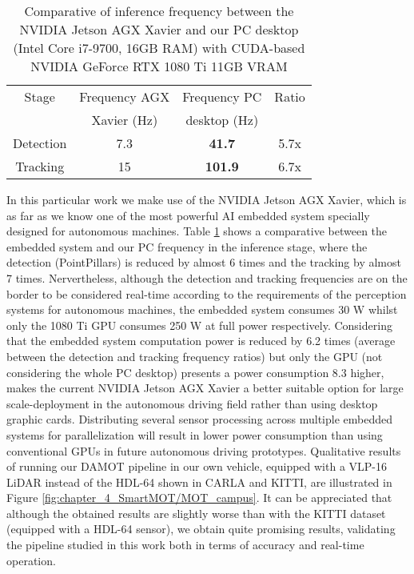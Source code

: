\begin{table}[h]
	\caption{Comparative of inference frequency between the NVIDIA Jetson AGX Xavier and our PC desktop (Intel Core i7-9700, 16GB RAM) with CUDA-based NVIDIA GeForce RTX 1080 Ti 11GB VRAM}
	\label{table:xavier_vs_computer_hz}
	\begin{center}
		\begin{tabular}{ c | c c c}
			\toprule
			Stage & Frequency AGX &  Frequency PC & Ratio \\
			& Xavier (Hz) & desktop (Hz) & \\
			\midrule
			Detection & 7.3 & \bf{41.7} & 5.7x \\
			\hline
			Tracking & 15 & \bf{101.9} & 6.7x \\
			\bottomrule
		\end{tabular}
	\end{center}
\end{table}

In this particular work we make use of the NVIDIA Jetson AGX Xavier, which is as far as we know one of the most powerful AI embedded system specially designed for autonomous machines. Table \ref{table:xavier_vs_computer_hz} shows a comparative between the embedded system and our PC frequency in the inference stage, where the detection (PointPillars) is reduced by almost 6 times and the tracking by almost 7 times. Nervertheless, although the detection and tracking frequencies are on the border to be considered real-time according to the requirements of the perception systems for autonomous machines, the embedded system consumes 30 W whilst only the 1080 Ti GPU consumes 250 W at full power respectively. Considering that the embedded system computation power is reduced by 6.2 times (average between the detection and tracking frequency ratios) but only the GPU (not considering the whole PC desktop) presents a power consumption 8.3 higher, makes the current NVIDIA Jetson AGX Xavier a better suitable option for large scale-deployment in the autonomous driving field rather than using desktop graphic cards. Distributing several sensor processing across multiple embedded systems for parallelization will result in lower power consumption than using conventional GPUs in future autonomous driving prototypes. Qualitative results of running our \ac{DAMOT} pipeline in our own vehicle, equipped with a VLP-16 LiDAR instead of the HDL-64 shown in CARLA and KITTI, are illustrated in Figure \ref{fig:chapter_4_SmartMOT/MOT_campus}. It can be appreciated that although the obtained results are slightly worse than with the KITTI dataset (equipped with a HDL-64 sensor), we obtain quite promising results, validating the pipeline studied in this work both in terms of accuracy and real-time operation.

